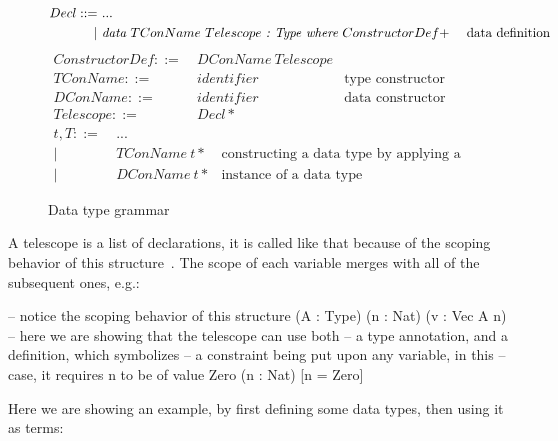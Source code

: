 \begin{figure}[H]
       \[
              \begin{aligned}
                     Decl ::= & \ ... \\
                     |        & \ \emph{data}\ TConName\ Telescope\ \emph{:\ Type\ where}\ ConstructorDef+ & \ \text{data definition}
              \end{aligned}
       \]
       \[
              \begin{aligned}
                     ConstructorDef ::= & \  DConName\ Telescope \\
                     TConName       ::= & \ identifier & \text{type constructor name} \\
                     DConName       ::= & \ identifier & \text{data constructor name} \\
                     Telescope      ::= & \ Decl*
              \end{aligned}
       \]
       \[
              \begin{aligned}
                     t, T ::= & \ ... \\
                     |        & \ TConName\ t* & \text{constructing a data type by applying a list of arguments}     \\
                     |        & \ DConName\ t* & \text{instance of a data type}
              \end{aligned}
       \]
       \caption{Data type grammar}
\end{figure}


\begin{definition}[Telescope]
       A telescope is a list of declarations, it is called like that because of the scoping behavior of this structure~\cite{oplss}.
       The scope of each variable merges with all of the subsequent ones, e.g.:
       \begin{piforall}
              -- notice the scoping behavior of this structure
              (A : Type) (n : Nat) (v : Vec A n)
              -- here we are showing that the telescope can use both
              -- a type annotation, and a definition, which symbolizes
              -- a constraint being put upon any variable, in this
              -- case, it requires n to be of value Zero
              (n : Nat) [n = Zero]
       \end{piforall}
\end{definition}

Here we are showing an example, by first defining some data types, then using it as terms:


